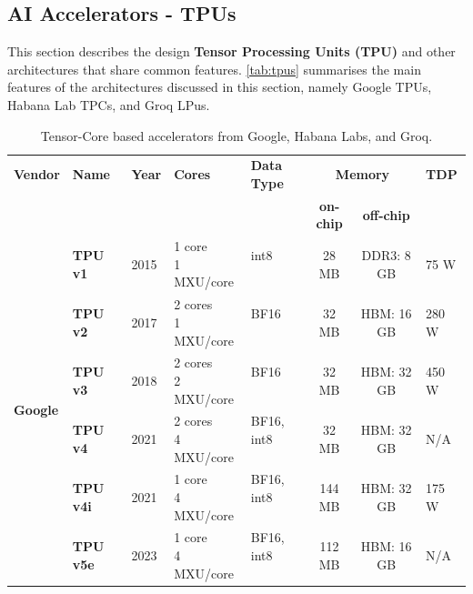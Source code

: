 \subsection{AI Accelerators - TPUs}\label{chap:background:sec:tpu}

This section describes the design \textbf{Tensor Processing Units (TPU)} and other architectures that share common features. \ref{tab:tpus} summarises the main features of the architectures discussed in this section, namely Google TPUs, Habana Lab TPCs, and Groq LPus.

\begin{table}[h!]
\centering
\footnotesize
\caption{Tensor-Core based accelerators from Google, Habana Labs, and Groq.}
\scriptsize
\begin{tabularx}{\textwidth}{|l|l|l|l|l|c|c|l|}
\cline{1-8}
\textbf{Vendor} & \textbf{Name} & \textbf{Year} & \textbf{Cores} & \textbf{Data Type} & \multicolumn{2}{c|}{\textbf{Memory}} & \textbf{TDP} \\
\cline{6-7} & & & & & \textbf{on-chip} & \textbf{off-chip} & \\
\cline{1-8}
\multirow{8}{*}{\textbf{Google}} 
&\textbf{TPU v1} & 2015 & \makecell[l]{1 core\\ 1 MXU/core} & \makecell[l]{int8 \\ \ } & 28 MB & DDR3: 8 GB& 75 W\\
\cline{2-8}
&\textbf{TPU v2} & 2017 & \makecell[l]{2 cores\\ 1 MXU/core} & \makecell[l]{BF16 \\ \ }& 32 MB & HBM: 16 GB& 280 W\\
\cline{2-8}
&\textbf{TPU v3} & 2018 & \makecell[l]{2 cores\\ 2 MXU/core} & \makecell[l]{BF16 \\ \ } & 32 MB & HBM: 32 GB& 450 W\\
\cline{2-8}
&\textbf{TPU v4} & 2021 & \makecell[l]{2 cores\\ 4 MXU/core} & \makecell[l]{BF16, int8 \\ \ } & 32 MB & HBM: 32 GB& N/A\\
\cline{2-8}
&\textbf{TPU v4i}& 2021 & \makecell[l]{1 core\\ 4 MXU/core} & \makecell[l]{BF16, int8 \\ \ } & 144 MB & HBM: 32 GB& 175 W\\
\cline{2-8}
&\textbf{TPU v5e} & 2023 & \makecell[l]{1 core\\ 4 MXU/core} & \makecell[l]{BF16, int8 \\ \ } & 112 MB & HBM: 16 GB& N/A\\

\end{tabularx}
\end{table}

